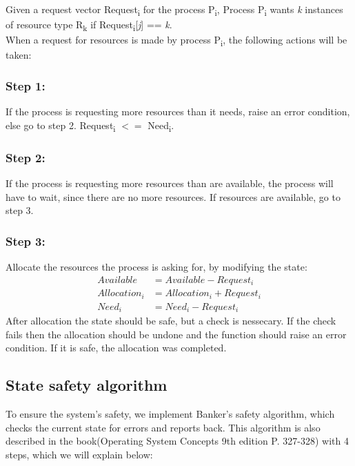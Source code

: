 Given a request vector Request\textsubscript{i} for the process P\textsubscript{i}, Process P\textsubscript{i} wants \textit{k} instances of resource type R\textsubscript{k} if Request\textsubscript{i}[\textit{j}] == \textit{k}.\\

When a request for resources is made by process P\textsubscript{i}, the following actions will be taken:

\subsubsection{Step 1:}
If the process is requesting more resources than it needs, raise an error condition, else go to step 2. Request\textsubscript{i} $<=$ Need\textsubscript{i}.

\subsubsection{Step 2:}
If the process is requesting more resources than are available, the process will have to wait, since there are no more resources. If resources are available, go to step 3.

\subsubsection{Step 3:}
Allocate the resources the process is asking for, by modifying the state:
\begin{align*}
Available    &= Available-Request_i\\
Allocation_i &= Allocation_i + Request_i\\
Need_i       &= Need_i - Request_i
\end{align*}
After allocation the state should be safe, but a check is nessecary. If the check fails then the allocation should be undone and the function should raise an error condition. If it is safe, the allocation was completed.



\subsection{State safety algorithm}
To ensure the system's safety, we implement Banker's safety algorithm, which checks the current state for errors and reports back. This algorithm is also described in the book(Operating System Concepts 9th edition P. 327-328) with 4 steps, which we will explain below:

